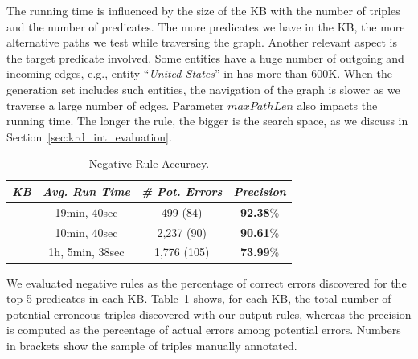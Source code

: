 The running time is influenced by the size of the KB with the number of triples and the number of predicates. %
 The more predicates we have in the KB, the more alternative paths we test while traversing the graph.
Another relevant aspect is the target predicate involved. Some entities have a huge number of outgoing and incoming edges, e.g., entity ``\textit{United States}'' in \wikidata has more than $600$K. When the generation set includes such entities, the navigation of the graph is slower as we traverse a large number of edges. 
Parameter $maxPathLen$  also impacts the running time. The longer the rule, the bigger is the search space, as we discuss in Section~\ref{sec:krd_int_evaluation}. 


\vspace{-1ex}
\begin{table}[htb]
	\centering
	\caption{\krd Negative Rule Accuracy.}
			\vspace{-2ex}
	\label{tab:neg_rules_acc}
	\begin{small}
	\begin{tabular}{|c|c|c|c|}
		\hline
		\hline
		{\it KB}&{\it Avg. Run Time}&{\it \# Pot. Errors} & {\it Precision} \tabularnewline
		\hline
		\dbpedia & 19min, 40sec& 499 (84) & \textbf{92.38}\%\tabularnewline
		\yago 3 & 10min, 40sec & 2,237 (90) & \textbf{90.61}\%\tabularnewline
		\wikidata & 1h, 5min, 38sec & 1,776 (105)& \textbf{73.99}\%\tabularnewline
		\hline
	\end{tabular}
	\end{small}
\end{table}

We evaluated negative rules as the percentage of correct errors discovered for the top 5 predicates in each KB. Table~\ref{tab:neg_rules_acc} shows, for each KB, the total number of potential erroneous triples discovered with our output rules, whereas the precision is computed as the percentage of actual errors among potential errors. Numbers in brackets show the sample of %
triples manually annotated.

